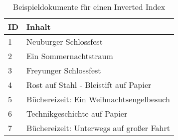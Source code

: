 \renewcommand{\arraystretch}{1.2}
\begin{table}[ht]
\begin{margincap}
\centering
\begin{tabularx}{0.6\textwidth}{l|X}
ID & Inhalt \\
\hline
1 & Neuburger Schlossfest \\
2 & Ein Sommernachtstraum \\
3 & Freyunger Schlossfest \\
4 & Rost auf Stahl - Bleistift auf Papier \\
5 & Büchereizeit: Ein Weihnachtsengelbesuch \\
6 & Technikgeschichte auf Papier \\
7 & Büchereizeit: Unterwegs auf großer Fahrt \\
\end{tabularx}
\caption[Beispieldokumente für einen Inverted Index]{Beispieldokumente für einen Inverted Index}
\label{tab:lucene_documents_example}
\end{margincap}
\end{table}

